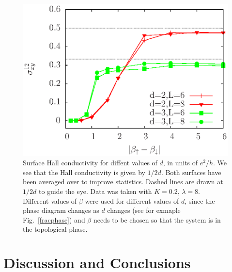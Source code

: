 \documentclass[prb,twocolumn]{revtex4-1}
\begin{document}
\begin{figure}
\includegraphics[angle=-90,width=0.9\linewidth]{figures/halldiff.eps}
\caption{Surface Hall conductivity for diffent values of $d$, in units of $e^2/h$. We see that the Hall conductivity is given by $1/2d$. Both surfaces have been averaged over to improve statistics. Dashed lines are drawn at $1/2d$ to guide the eye. Data was taken with $K=0.2$, $\lambda=8$. Different values of $\beta$ were used for different values of $d$, since the phase diagram changes as $d$ changes (see for exmaple Fig.~\ref{fracphase}) and $\beta$ needs to be chosen so that the system is in the topological phase.}
\label{halldiff}
\end{figure}


\section{Discussion and Conclusions}


\end{document}
